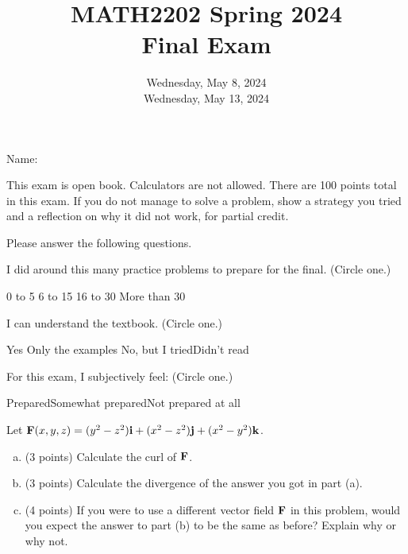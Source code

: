 \documentclass[11pt,oneside]{amsart}
\title{MATH2202 Spring 2024\\
Final Exam}
\author{Wednesday, May 8, 2024\\Wednesday, May 13, 2024}
\begin{document}
\maketitle

Name: \underline{\hspace{6cm}}

This exam is open book. Calculators are not allowed. There are 100 points total in this exam. If you do not manage to solve a problem, show a strategy you tried and a reflection on why it did not work, for partial credit.

\vskip 2cm

Please answer the following questions.

\begin{question}
  I did around this many practice problems to prepare for the final. (Circle one.)

  \hspace{1.5cm}0 to 5\hspace{0.1\textwidth} 6 to 15\hspace{0.1\textwidth} 16 to 30 \hspace{0.1\textwidth} More than 30
\end{question}

\begin{question}
  I can understand the textbook. (Circle one.)

  \hspace{1.5cm}Yes\hspace{1.5cm} Only the examples\hspace{1.5cm} No, but I tried\hspace{1.5cm}Didn't read
\end{question}

\begin{question}
  For this exam, I subjectively feel: (Circle one.)

  \hspace{1.5cm}Prepared\hspace{0.1\textwidth}Somewhat prepared\hspace{0.1\textwidth}Not prepared at all
\end{question}

\newpage

\begin{problem}
  Let $\mathbf F(x,y,z)=(y^2-z^2)\mathbf i+(x^2-z^2)\mathbf j+(x^2-y^2)\mathbf k$.
  \begin{enumerate}[(a)]
    \item (3 points) Calculate the curl of $\mathbf F$.
    \vfil
    \item (3 points) Calculate the divergence of the answer you got in part (a).
    \vfil
    \item (4 points) If you were to use a different vector field $\mathbf F$ in this problem, would you expect the answer to part (b) to be the same as before? Explain why or why not.
  \end{enumerate}
\end{problem}
\end{document}
